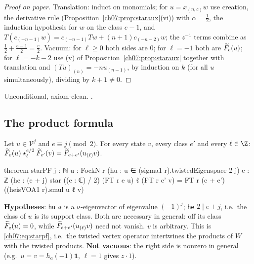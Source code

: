 \begin{proof}[Proof on paper]
Translation: induct on monomials; for $u = x_{(n,c)}w$ use creation, the derivative rule
(Proposition~\ref{ch07:prop:staraux}(vi)) with $\alpha = \frac12$, the induction hypothesis for
$w$ on the class $e-1$, and $T(c_{(-n-1)}w) = c_{(-n-1)}Tw + (n+1)c_{(-n-2)}w$; the $z^{-1}$ terms
combine as $\frac12+\frac{e-1}2 = \frac e2$. Vacuum: for $\ell\ge0$ both sides are $0$; for
$\ell = -1$ both are $\widetilde{F}_e(u)$; for $\ell = -k-2$ use (v) of
Proposition~\ref{ch07:prop:staraux} together with translation and $(Tu)_{(n)} = -nu_{(n-1)}$,
by induction on $k$ (for all $u$ simultaneously), dividing by $k+1\ne0$.
\end{proof}

\begin{status}
Unconditional, axiom-clean.
.
\end{status}

\subsection{The product formula}

\begin{theorem}\label{ch07:thm:starPF}
Let $u\in\mathcal V^j$ and $e\equiv j\pmod2$. For every state $v$, every class $e'$ and every
$\ell\in\Z$: $\widetilde{F}_e(u)\star^{e/2}_\ell\widetilde{F}_{e'}(v) = \widetilde{F}_{e+e'}(u_{(\ell)}v)$.
\end{theorem}

\begin{leancode}
theorem starPF {j : ℕ} {u : FockN r} (hu : u ∈ (sigma1 r).twistedEigenspace 2 j) {e : ℤ}
    (he : (e + j) %
    star ((e : ℂ) / 2) (FT r e u) ℓ (FT r e' v) = FT r (e + e') ((heisVOA1 r).smul u ℓ v)
\end{leancode}

\begin{dictionary}
\textbf{Hypotheses}: \verb|hu| $u$ is a $\sigma$-eigenvector of eigenvalue $(-1)^j$; \verb|he|
$2\mid e+j$, i.e.\ the class of $u$ is its support class. Both are necessary in general: off its
class $\widetilde{F}_e(u) = 0$, while $\widetilde{F}_{e+e'}(u_{(\ell)}v)$ need not vanish. $v$ is
arbitrary. This is \eqref{ch07:eq:starpf}, i.e.\ the twisted vertex operator intertwines the
products of $W$ with the twisted products. \textbf{Not vacuous}: the right side is nonzero in
general (e.g.\ $u = v = h_a(-1)\mathbf 1$, $\ell = 1$ gives $z\cdot 1$).
\end{dictionary}

